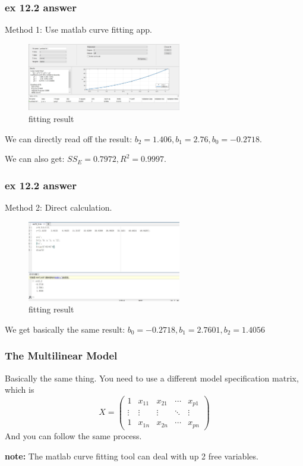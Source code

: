 \documentclass{beamer}
\begin{document}
\begin{frame}
    \frametitle{ex 12.2 answer}

    Method 1: Use matlab curve fitting app.\par
    \begin{figure}[H]
        \centering
        \includegraphics[width=0.6\textwidth,height=0.3\textwidth]{ex12_2_1.jpg}
        \caption{fitting result}
    \end{figure}\par
    We can directly read off the result: $b_2=1.406, b_1=2.76, b_0=-0.2718$. \par
    We can also get: $SS_{E}=0.7972, R^2=0.9997$.
\end{frame}

\begin{frame}
    \frametitle{ex 12.2 answer}
    Method 2: Direct calculation.
    \par
    \begin{figure}[H]
        \centering
        \includegraphics[width=0.6\textwidth,height=0.3\textwidth]{ex12_2_2.jpg}
        \caption{fitting result}
    \end{figure}\par
    We get basically the same result: $b_0=-0.2718, b_1=2.7601, b_2=1.4056$

\end{frame}

\begin{frame}
    \frametitle{The Multilinear Model}

    Basically the same thing. You need to use a different model specification matrix, which is
    \begin{equation*}
        X=
        \left(
        \begin{array}{ccccc}
            1 & x_{11} & x_{21} & \cdots & x_{p1}\\
            \vdots & \vdots & \vdots & \ddots & \vdots\\
            1 & x_{1n} & x_{2n} & \cdots & x_{pn}
        \end{array}
        \right)
    \end{equation*}
    And you can follow the same process.\par
    \textbf{note:} The matlab curve fitting tool can deal with up 2 free variables.

\end{frame}
\end{document}
